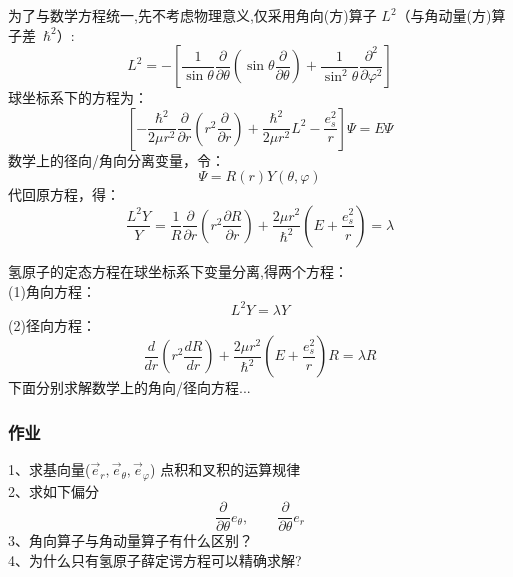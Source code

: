 \begin{frame}
	为了与数学方程统一,先不考虑物理意义,仅采用角向(方)算子 $L^2$（与角动量(方)算子差~$\hbar ^2$）:
	\begin{equation*}
		L^2 =  -\left[ \frac{1}{ \sin \theta  } \frac{\partial }{\partial \theta } (\sin \theta \frac{\partial }{\partial \theta } )
		+\frac{1}{ \sin^2 \theta  } \frac{\partial^2}{\partial\varphi ^2} \right]
	\end{equation*}	
	球坐标系下的方程为：
	\begin{equation*}
		\left[-\frac{\hbar^2}{2 \mu r^2}  \frac{\partial }{\partial r} (r^2\frac{\partial }{\partial r} ) +  \frac{\hbar ^2 }{2 \mu r^2} L^2  -\frac{e_s ^2}{r} \right] \Psi
		=E\Psi
	\end{equation*}	
	数学上的径向/角向分离变量，令： 
	\begin{equation*}
		\Psi=R (r) Y(\theta,\varphi)
	\end{equation*}	
	代回原方程，得：
	\begin{equation*}
		\frac{ L^2 Y}{Y}= \frac{1}{R}   \frac{\partial }{\partial r} (r^2\frac{\partial R }{\partial r} ) + \frac{2 \mu r^2} {\hbar^2}(E+ \frac{e_s ^2}{r} )=\lambda
	\end{equation*}	
\end{frame}		

\begin{frame}
	氢原子的定态方程在球坐标系下变量分离,得两个方程：	\\
	(1)角向方程：
	\begin{equation*}
		L^2 Y=\lambda Y
	\end{equation*}	
	(2)径向方程：
	\begin{equation*}
		\frac{d}{d r} (r^2\frac{d R }{d r} ) + \frac{2 \mu r^2} {\hbar^2}(E+ \frac{e_s ^2}{r} ) R =\lambda R
	\end{equation*}	
	下面分别求解数学上的角向/径向方程...
\end{frame}	

\begin{frame}
	\frametitle{ 作业 }
	1、求基向量($\vec{e}_r, \vec{e}_\theta, \vec{e}_\varphi$) 点积和叉积的运算规律\\
	2、求如下偏分
	\begin{equation*}
	\frac{\partial }{\partial \theta}  e_\theta, \qquad \frac{\partial }{\partial \theta}  e_r 
	\end{equation*}	
    3、角向算子与角动量算子有什么区别？ \\
	4、为什么只有氢原子薛定谔方程可以精确求解?
\end{frame}	

